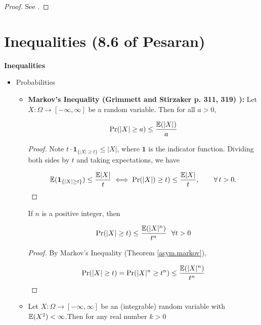 \begin{proof} See \citet{kingman1966introduction}. \end{proof}


\section{Inequalities (8.6 of Pesaran)}
\label{sec:tsch8.6}

\textbf{Inequalities}

\begin{itemize}

\item Probabilities

\begin{itemize}

\item \begin{lemma}\label{asym.markov} \textbf{Markov's Inequality (Grimmett and Stirzaker p. 311, 319) ):} Let \(X: \Omega \to [-\infty, \infty]\) be a random variable. Then for all \(a > 0\),

\[
\Pr(|X| \geq a) \leq \frac{\mathbb{E}(|X|)}{a}
\]
\end{lemma}
\begin{proof} Note \( t \cdot \boldsymbol{1}_{\{|X| \geq t\}} \leq |X|\), where \(\boldsymbol{1}\) is the indicator function. Dividing both sides by \(t\) and taking expectations, we have \

\[
\mathbb{E}( \boldsymbol{1}_{\{|X| \geq t\}}) \leq \frac{\mathbb{E} |X|}{t} \iff \Pr(|X|)\geq t)\leq\frac{\mathbb{E} |X|}{t},\qquad\forall\,t>0.
\] \end{proof}

\begin{corollary} If \(n\) is a positive integer, then

\[
\Pr(|X| \geq t) \leq \frac{\mathbb{E}(|X|^n)}{t^n} \ \ \forall t > 0
\]

\end{corollary}

\begin{proof}By Markov's Inequality (Theorem \ref{asym.markov}), 

\[
\Pr(|X| \geq t) = \Pr(|X|^n \geq t^n) \leq \frac{\mathbb{E}(|X|^n)}{t^n}
\]

\end{proof}

\item \begin{theorem}\label{asym.cheby} Let \(X: \Omega \to [-\infty, \infty]\) be an (integrable) random variable with \(\mathbb{E}(X^2) < \infty\).Then for any real number \(k > 0\)


\end{theorem}
\end{itemize}
\end{itemize}
